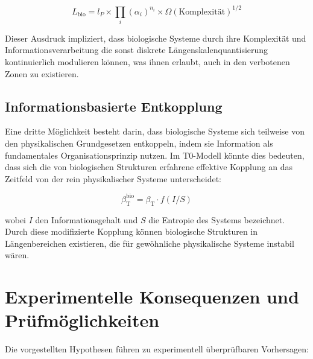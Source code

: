 \documentclass[12pt,a4paper]{article}
\newcommand{\betaT}{\beta_{\text{T}}}
\begin{document}
	\begin{equation}
		L_{\text{bio}} = l_P \times \prod_{i} (\alpha_i)^{n_i} \times \Omega(\text{Komplexität})^{1/2}
	\end{equation}
	
	Dieser Ausdruck impliziert, dass biologische Systeme durch ihre Komplexität und Informationsverarbeitung die sonst diskrete Längen\-skalen\-quantisierung kontinuierlich modulieren können, was ihnen erlaubt, auch in den verbotenen Zonen zu existieren.
	
	\subsection{Informationsbasierte Entkopplung}
	\label{subsec:informationsbasierte_entkopplung}
	
	Eine dritte Möglichkeit besteht darin, dass biologische Systeme sich teilweise von den physikalischen Grundgesetzen entkoppeln, indem sie Information als fundamentales Organisations\-prinzip nutzen. Im T0-Modell könnte dies bedeuten, dass sich die von biologischen Strukturen erfahrene effektive Kopplung an das Zeitfeld von der rein physikalischer Systeme unterscheidet:
	
	\begin{equation}
		\betaT^{\text{bio}} = \betaT \cdot f(I/S)
	\end{equation}
	
	wobei $I$ den Informationsgehalt und $S$ die Entropie des Systems bezeichnet. Durch diese modifizierte Kopplung können biologische Strukturen in Längen\-bereichen existieren, die für gewöhnliche physikalische Systeme instabil wären.
	
	\section{Experimentelle Konsequenzen und Prüfmöglichkeiten}
	\label{sec:experimentelle_konsequenzen}
	
	Die vorgestellten Hypothesen führen zu experimentell überprüfbaren Vorhersagen:
	
\end{document}
